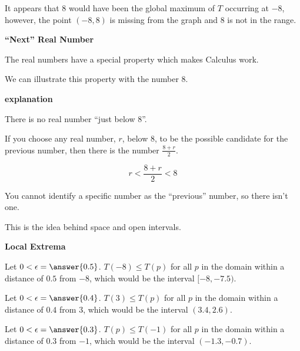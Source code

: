 \documentclass{ximera}
\begin{document}
It appears that $8$ would have been the global maximum of $T$ occurring at $-8$, however, the point $(-8, 8)$ is missing from the graph and $8$ is not in the range.  



\begin{idea}  \textbf{\textcolor{blue!55!black}{``Next'' Real Number}}


The real numbers have a special property which makes Calculus work. 

We can illustrate this property with the number $8$. 

\textbf{\textcolor{red!75!green}{explanation}} 




There is no real number ``just below $8$''.  


If you choose any real number, $r$, below $8$, to be the possible candidate for the previous number, then there is the number $\frac{8+r}{2}$. 

\[  
r < \frac{8+r}{2} < 8
\]  

You cannot identify a specific number as the ``previous'' number, so there isn't one. 

This is the idea behind space and open intervals.




\end{idea}



\begin{explanation} \textbf{\textcolor{red!75!green}{Local Extrema}}  


Let $0 < \epsilon = \answer{0.5}$.  $T(-8) \leq T(p)$ for all $p$ in the domain within a distance of $0.5$ from $-8$, which would be the interval $[-8, -7.5)$.

Let $0 < \epsilon = \answer{0.4}$.  $T(3) \leq T(p)$ for all $p$ in the domain within a distance of $0.4$ from $3$, which would be the interval $(3.4, 2.6)$.

Let $0 < \epsilon = \answer{0.3}$.  $T(p) \leq T(-1)$ for all $p$ in the domain within a distance of $0.3$ from $-1$, which would be the interval $(-1.3, -0.7)$.

\end{explanation}
\end{document}
